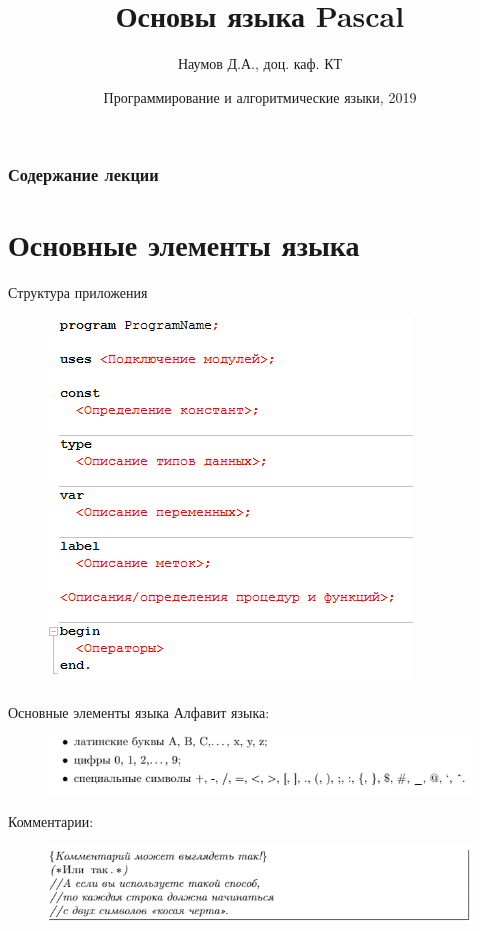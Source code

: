 \documentclass{beamer}
\title[Основы языка Pascal]{Основы языка Pascal}
\author{Наумов Д.А., доц. каф. КТ}
\date[19.09.2019] {Программирование и алгоритмические языки, 2019}
\begin{document}
\begin{frame}
  \titlepage
\end{frame}
  
\begin{frame}
  \frametitle{Содержание лекции}
  \tableofcontents  
\end{frame}

\section{Основные элементы языка}

\begin{frame}{Структура приложения}
\begin{figure}[h]
\centering
\includegraphics[scale=0.75]{images/lec02-pic01.png}
\end{figure}
\end{frame} 

\begin{frame}{Основные элементы языка}
Алфавит языка:
\begin{figure}[h]
\centering
\includegraphics[scale=0.75]{images/lec02-pic02.png}
\end{figure}
Комментарии:
\begin{figure}[h]
\centering
\includegraphics[scale=0.75]{images/lec02-pic03.png}
\end{figure}
\end{frame}
\end{document}
